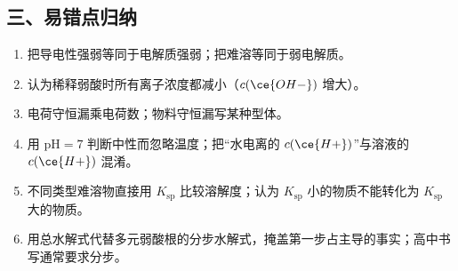 \documentclass[UTF8,a4paper,zihao=5,oneside,openany,fontset=none]{ctexbook}
\begin{document}
\subsection*{三、易错点归纳}
\begin{enumerate}
\item 把导电性强弱等同于电解质强弱；把难溶等同于弱电解质。
\item 认为稀释弱酸时所有离子浓度都减小（$c(\ce{OH-})$ 增大）。
\item 电荷守恒漏乘电荷数；物料守恒漏写某种型体。
\item 用 pH$=7$ 判断中性而忽略温度；把“水电离的 $c(\ce{H+})$”与溶液的 $c(\ce{H+})$ 混淆。
\item 不同类型难溶物直接用 $K_\text{sp}$ 比较溶解度；认为 $K_\text{sp}$ 小的物质不能转化为 $K_\text{sp}$ 大的物质。
\item 用总水解式代替多元弱酸根的分步水解式，掩盖第一步占主导的事实；高中书写通常要求分步。
\end{enumerate}
\end{document}
